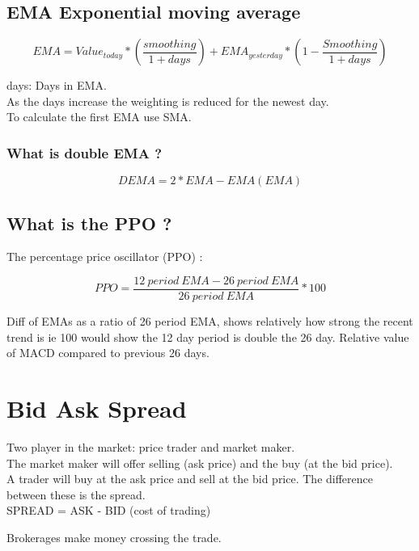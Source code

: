 \documentclass[11pt]{scrartcl} %
\begin{document}
\subsection{EMA Exponential moving average}

\[ EMA = Value_{today} *(\frac{smoothing}{1 + days}) + EMA_{yesterday}*(1-\frac{Smoothing}{1+days}) \]

days: Days in EMA.\\

As the days increase the weighting is reduced for the newest day.\\

To calculate the first EMA use SMA.

\subsubsection{What is double EMA ?}

\[ DEMA = 2*EMA - EMA(EMA) \]

\subsection{What is the PPO ?}

The percentage price oscillator (PPO) :

\[ PPO = \frac{12\:period\:EMA - 26\:period\:EMA}{26\:period\:EMA} *100 \]

Diff of EMAs as a ratio of 26 period EMA, shows relatively how strong the recent trend is ie 100 would
show the 12 day period is double the 26 day. Relative value of MACD compared to previous 26 days.

\section{Bid Ask Spread}

Two player in the market: price trader and market maker.\\

The market maker will offer selling (ask price) and the buy (at the bid price).\\

A trader will buy at the ask price and sell at the bid price. The difference between these is the
spread.\\

SPREAD = ASK - BID (cost of trading)

Brokerages make money crossing the trade.\\
\end{document}
